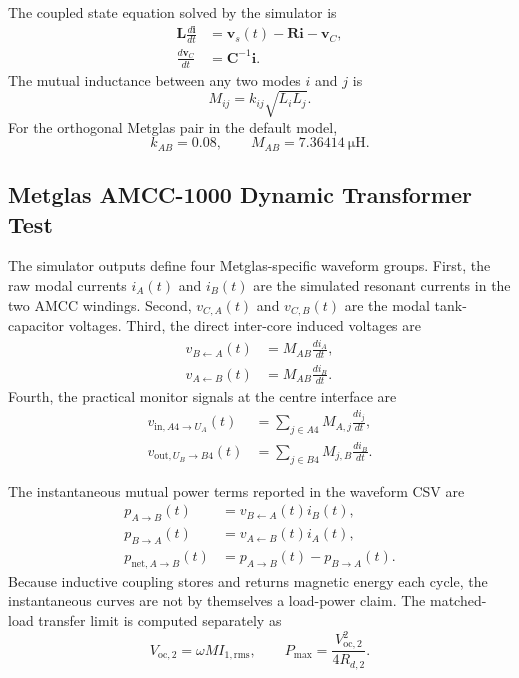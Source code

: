 The coupled state equation solved by the simulator is
\begin{align}
\mathbf{L}\frac{d\mathbf{i}}{dt} &= \mathbf{v}_s(t)-\mathbf{R}\mathbf{i}-\mathbf{v}_C,\\
\frac{d\mathbf{v}_C}{dt} &= \mathbf{C}^{-1}\mathbf{i}.
\end{align}
The mutual inductance between any two modes \(i\) and \(j\) is
\begin{equation}
M_{ij}=k_{ij}\sqrt{L_iL_j}.
\end{equation}
For the orthogonal Metglas pair in the default model,
\begin{equation}
k_{AB}=0.08, \qquad M_{AB}=\SI{7.36414}{\micro\henry}.
\end{equation}

\subsection{Metglas AMCC-1000 Dynamic Transformer Test}
\label{subsec:metglas-amcc1000-dynamic-test}

The simulator outputs define four Metglas-specific waveform groups. First, the
raw modal currents \(i_A(t)\) and \(i_B(t)\) are the simulated resonant currents
in the two AMCC windings. Second, \(v_{C,A}(t)\) and \(v_{C,B}(t)\) are the
modal tank-capacitor voltages. Third, the direct inter-core induced voltages
are
\begin{align}
v_{B\leftarrow A}(t) &= M_{AB}\frac{di_A}{dt},\\
v_{A\leftarrow B}(t) &= M_{AB}\frac{di_B}{dt}.
\end{align}
Fourth, the practical monitor signals at the centre interface are
\begin{align}
v_{\mathrm{in},A4\rightarrow U_A}(t)
&= \sum_{j\in A4} M_{A,j}\frac{di_j}{dt},\\
v_{\mathrm{out},U_B\rightarrow B4}(t)
&= \sum_{j\in B4} M_{j,B}\frac{di_B}{dt}.
\end{align}

The instantaneous mutual power terms reported in the waveform CSV are
\begin{align}
p_{A\rightarrow B}(t)&=v_{B\leftarrow A}(t)i_B(t),\\
p_{B\rightarrow A}(t)&=v_{A\leftarrow B}(t)i_A(t),\\
p_{\mathrm{net},A\rightarrow B}(t)&=p_{A\rightarrow B}(t)-p_{B\rightarrow A}(t).
\end{align}
Because inductive coupling stores and returns magnetic energy each cycle, the
instantaneous curves are not by themselves a load-power claim. The matched-load
transfer limit is computed separately as
\begin{equation}
V_{\mathrm{oc},2}=\omega M I_{1,\mathrm{rms}},
\qquad
P_{\max}=\frac{V_{\mathrm{oc},2}^{2}}{4R_{d,2}}.
\end{equation}

